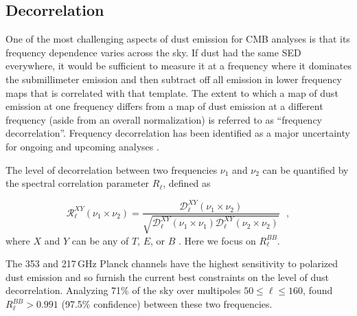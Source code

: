 \documentclass[twocolumn]{aastex631}
\begin{document}


\subsection{Decorrelation} \label{subsec:decorrelation}

One of the most challenging aspects of dust emission for CMB analyses is that its frequency dependence varies across the sky. If dust had the same SED everywhere, it would be sufficient to measure it at a frequency where it dominates the submillimeter emission and then subtract off all emission in lower frequency maps that is correlated with that template. The extent to which a map of dust emission at one frequency differs from a map of dust emission at a different frequency (aside from an overall normalization) is referred to as ``frequency decorrelation''. Frequency decorrelation has been identified as a major uncertainty for ongoing and upcoming analyses \citep{Ade:2021}.

The level of decorrelation between two frequencies $\nu_1$ and $\nu_2$ can be quantified by the spectral correlation parameter $R_\ell$, defined as

\begin{equation} \label{eq:R_ell}
    \mathcal{R}^{XY}_\ell(\nu_1\times\nu_2) = \frac{\mathcal{D}_\ell^{XY}(\nu_1\times\nu_2)}{\sqrt{\mathcal{D}_\ell^{XY}(\nu_1\times\nu_1)\mathcal{D}_\ell^{XY}(\nu_2\times\nu_2)}}
    ~~~,
\end{equation}
where $X$ and $Y$ can be any of $T$, $E$, or $B$ \citep{planck2016-L}. Here we focus on $R_\ell^{BB}$.

The 353 and 217\,GHz Planck channels have the highest sensitivity to polarized dust emission and so furnish the current best constraints on the level of dust decorrelation. Analyzing 71\% of the sky over multipoles $50 \leq \ell \leq 160$, \citet{planck2016-l11A} found $R_\ell^{BB} > 0.991$ (97.5\% confidence) between these two frequencies.
\end{document}
